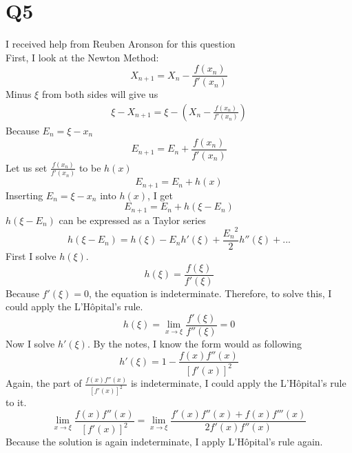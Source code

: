 \documentclass{article}
\begin{document}
\section{Q5}
I received help from Reuben Aronson for this question\\
First, I look at the Newton Method:
\begin{equation*}
X_{n+1} = X_{n} - \frac{f(x_n)}{f'(x_n)}
\end{equation*}
Minus $\xi$ from both sides will give us
\begin{equation*}
\begin{aligned}
\xi - X_{n+1} = \xi - (X_{n} - \frac{f(x_n)}{f'(x_n)})
\end{aligned}
\end{equation*}
Because $E_n = \xi - x_n$
\begin{equation*}
E_{n+1} = E_n + \frac{f(x_n)}{f'(x_n)}
\end{equation*}
Let us set $\frac{f(x_n)}{f'(x_n)}$ to be $h(x)$
\begin{equation*}
E_{n+1} = E_n + h(x)
\end{equation*}
Inserting $E_n = \xi - x_n$ into $h(x)$, I get
\begin{equation*}
E_{n+1} = E_n + h(\xi - E_n)
\end{equation*}
$h(\xi - E_n)$ can be expressed as a Taylor series
\begin{equation*}
h(\xi - E_n) = h(\xi) - E_nh'(\xi) + \frac{{E_n}^2}{2}h''(\xi) + ...
\end{equation*}
First I solve $h(\xi)$.
\begin{equation*}
h(\xi) =\frac{f(\xi)}{f'(\xi)}
\end{equation*}
Because $f'(\xi) = 0$, the equation is indeterminate. Therefore, to solve this, I could apply the L'H\^opital's rule.
\begin{equation*}
h(\xi) = \lim_{x\to\xi}\frac{f'(\xi)}{f''(\xi)} = 0
\end{equation*}
Now I solve $h'(\xi)$. By the notes, I know the form would as following
\begin{equation*}
h'(\xi) = 1 - \frac{f(x)f''(x)}{[f'(x)]^2}
\end{equation*}
Again, the part of $\frac{f(x)f''(x)}{[f'(x)]^2}$ is indeterminate, I could apply the L'H\^opital's rule to it.
\begin{equation*}
\lim_{x\to\xi} \frac{f(x)f''(x)}{[f'(x)]^2} = \lim_{x\to\xi} \frac{f'(x)f''(x) + f(x)f'''(x)}{2f'(x)f''(x)}
\end{equation*}
Because the solution is again indeterminate, I apply L'H\^opital's rule again.
\end{document}
